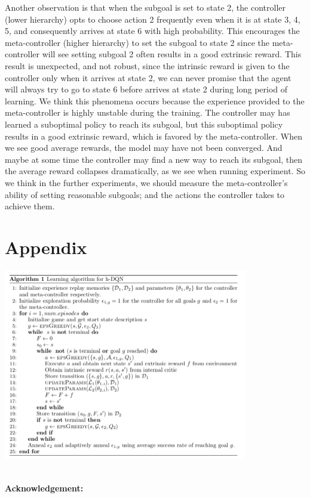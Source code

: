 \documentclass{article}
\newcommand{\Acknowledgement}[1]{\ \\{\bf Acknowledgement:} #1}
\begin{document}
\begin{spacing}{1.1}
    Another observation is that when the subgoal is set to state 2, the controller (lower hierarchy) opts to choose action 2 frequently even when it is at state 3, 4, 5, and consequently arrives at state 6 with high probability. This encourages the meta-controller (higher hierarchy) to set the subgoal to state 2 since the meta-controller will see setting subgoal 2 often results in a good extrinsic reward. This result is unexpected, and not robust, since the intrinsic reward is given to the controller only when it arrives at state 2, we can never promise that the agent will always try to go to state 6 before arrives at state 2 during long period of learning. We think this phenomena occurs because the experience provided to the meta-controller is highly unstable during the training. The controller may has learned a suboptimal policy to reach its subgoal, but this suboptimal policy results in a good extrinsic reward, which is favored by the meta-controller. When we see good average rewards, the model may have not been converged. And maybe at some time the controller may find a new way to reach its subgoal, then the average reward collapses dramatically, as we see when running experiment. So we think in the further experiments, we should measure the meta-controller's ability of setting reasonable subgoals; and the actions the controller takes to achieve them.
    \section*{Appendix}
    \begin{center}
        \includegraphics[width = 0.8\textwidth]{pseudo.png}
    \end{center}
    \Acknowledgement{}


    \end{spacing}
    
\end{document}
